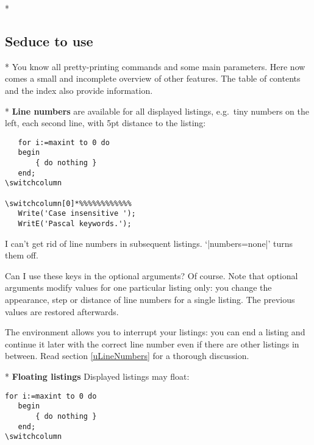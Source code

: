 \begin{paracol}{2}
\switchcolumn[0]*%
\subsection{Seduce to use}\label{gSeduceToUse}
\switchcolumn

\switchcolumn[0]*%
You know all pretty-printing commands and some main parameters. Here now
comes a small and incomplete overview of other features. The table of
contents and the index also provide information.
\switchcolumn

\switchcolumn[0]*%
\textbf{Line numbers}
are available for all displayed listings, e.g.~tiny numbers on the left, each
second line, with 5pt distance to the listing:
\begin{lstxsample}
   \lstset{numbers=left, numberstyle=\tiny, stepnumber=2, numbersep=5pt}
\end{lstxsample}
\begin{lstsample}{}{}
   \begin{lstlisting}
   for i:=maxint to 0 do
   begin
       { do nothing }
   end;
\switchcolumn

\switchcolumn[0]*%%%%%%%%%%%%
   Write('Case insensitive ');
   WritE('Pascal keywords.');
   \end{lstlisting}
\end{lstsample}
\begin{advise}
\item I can't get rid of line numbers in subsequent listings.
      \advisespace
      `|numbers=none|' turns them off.
\item Can I use these keys in the optional arguments?
      \advisespace
      Of course. Note that optional arguments modify values for one
      particular listing only: you change the appearance, step or distance
      of line numbers for a single listing. The previous values are
      restored afterwards.
\end{advise}
The environment allows you to interrupt your listings: you can end a listing
and continue it later with the correct line number even if there are other
listings in between. Read section \ref{uLineNumbers} for a thorough
discussion.
\switchcolumn

\switchcolumn[0]*%
\textbf{Floating listings}
Displayed listings may float:
\begin{lstsample}{\lstset{frame=tb}}{}
   \begin{lstlisting}[float,caption=A floating example]
   for i:=maxint to 0 do
   begin
       { do nothing }
   end;
\switchcolumn


\end{lstlisting}
\end{lstsample}
\end{paracol}
